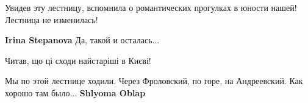  
 
 
 
 



Увидев эту лестницу, вспомнила о романтических прогулках в юности нашей! Лестница не изменилась!

\textbf{Irina Stepanova} Да, такой и осталась...

Читав, що ці сходи найстаріші в Києві!


Мы по этой лестнице ходили. Через Фроловский, по горе, на Андреевский. Как
хорошо там было... \textbf{Shlyoma Oblap}

